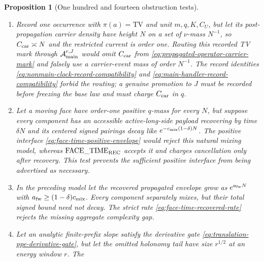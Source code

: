 \documentclass[11pt]{article}
\newtheorem{proposition}[theorem]{Proposition}
\begin{document}
\begin{proposition}[One hundred and fourteen obstruction tests]
\begin{enumerate}[label=\textup{(T\arabic*)}]
      $q_N=\delta_{a_N}$; similarly one may choose $q_r$ after the phase mode
      fixes $r$ and hence $N_{\rm PPE}(r)$.  All sectionwise masses and rate
      bounds can be uniform although no occurrence law was fixed before the
      linked tuple was known.  The datum-independent base law
      \eqref{eq:datum-independent-source-incidence-law} and the full linked
      consistency \eqref{eq:source-kernel-projective-consistency} reject
      both constructions; derived resolving coordinates select filters of
      one law and never select a new $q$.
\item Record one occurrence with $\pi(a)=\mathrm{TV}$ and unit
      $m,q,K,C_U$, but let its post-propagation carrier density have height
      $N$ on a set of $\nu$-mass $N^{-1}$, so $C_{\rm car}\asymp N$ and the
      restricted current is order one.  Routing this recorded TV mark through
      $\mathcal A_{\rm main}^{r,J}$ would omit $C_{\rm car}$ from
      \eqref{eq:propagated-operator-carrier-mark} and falsely use a
      carrier-event mass of order $N^{-1}$.  The record identities
      \eqref{eq:nonmain-clock-record-compatibility} and
      \eqref{eq:main-handler-record-compatibility} forbid the routing; a
      genuine promotion to $J$ must be recorded before freezing the base law
      and must charge $C_{\rm car}$ in $q$.
\item Let a moving face have order-one positive $q$-mass for every $N$, but
      suppose every component has an accessible active-long-side payload
      recovering by time $\delta N$ and its
      centered signed pairings decay like
      $e^{-c_{\rm mix}(1-\delta)N}$.  The positive interface
      \eqref{eq:face-time-positive-envelope} would reject this natural
      mixing model, whereas $\mathrm{FACE\_TIME}_{\rm REC}$ accepts it and
      charges cancellation only after recovery.  This test prevents the
      sufficient positive interface from being advertised as necessary.
\item In the preceding model let the recovered propagated envelope grow as
      $e^{a_{\rm fw}N}$ with
      $a_{\rm fw}\ge(1-\delta)c_{\rm mix}$.  Every component separately
      mixes, but their total signed bound need not decay.  The strict rate
      \eqref{eq:face-time-recovered-rate} rejects the missing aggregate
      complexity gap.
\item Let an analytic finite-prefix slope satisfy the derivative gate
      \eqref{eq:translation-ppe-derivative-gate}, but let the omitted
      holonomy tail have size $r^{1/2}$ at an energy window $r$.  The

\end{enumerate}
\end{proposition}
\end{document}
